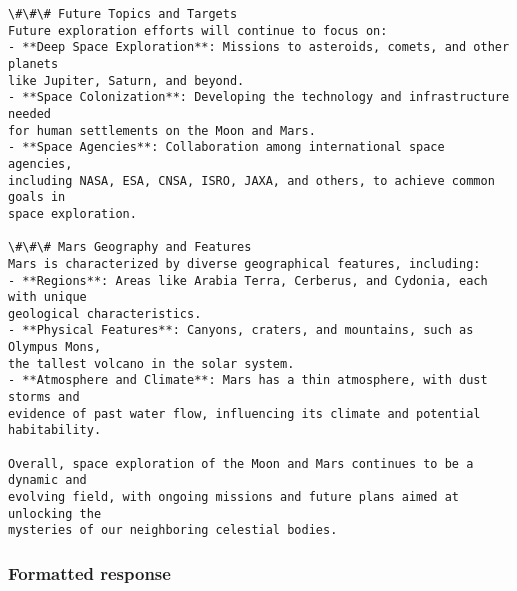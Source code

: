 \documentclass[11pt]{article}
\begin{document}
\begin{Verbatim}[commandchars=\\\{\}]
\#\#\# Future Topics and Targets
Future exploration efforts will continue to focus on:
- **Deep Space Exploration**: Missions to asteroids, comets, and other planets
like Jupiter, Saturn, and beyond.
- **Space Colonization**: Developing the technology and infrastructure needed
for human settlements on the Moon and Mars.
- **Space Agencies**: Collaboration among international space agencies,
including NASA, ESA, CNSA, ISRO, JAXA, and others, to achieve common goals in
space exploration.

\#\#\# Mars Geography and Features
Mars is characterized by diverse geographical features, including:
- **Regions**: Areas like Arabia Terra, Cerberus, and Cydonia, each with unique
geological characteristics.
- **Physical Features**: Canyons, craters, and mountains, such as Olympus Mons,
the tallest volcano in the solar system.
- **Atmosphere and Climate**: Mars has a thin atmosphere, with dust storms and
evidence of past water flow, influencing its climate and potential habitability.

Overall, space exploration of the Moon and Mars continues to be a dynamic and
evolving field, with ongoing missions and future plans aimed at unlocking the
mysteries of our neighboring celestial bodies.
    \end{Verbatim}

    \subsubsection{Formatted response}\label{formatted-response}
\end{document}
